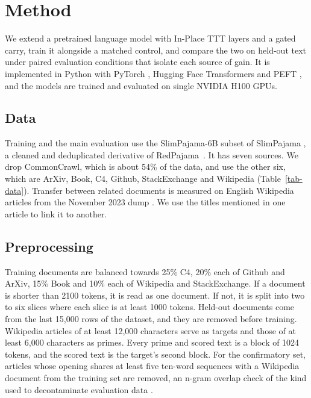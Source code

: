 \documentclass[10pt]{article} %
\begin{document}
\section{Method}

We extend a pretrained language model with In-Place TTT layers and a gated carry, train it alongside a matched control, and compare the two on held-out text under paired evaluation conditions that isolate each source of gain. It is implemented in Python with PyTorch \citep{paszke2019pytorch}, Hugging Face Transformers \citep{wolf2020transformers} and PEFT \citep{mangrulkar2022peft}, and the models are trained and evaluated on single NVIDIA H100 GPUs.

\subsection{Data}

Training and the main evaluation use the SlimPajama-6B subset \citep{yoon2023slimpajama6b} of SlimPajama \citep{soboleva2023slimpajama}, a cleaned and deduplicated derivative of RedPajama~\citep{weber2024redpajama}. It has seven sources. We drop CommonCrawl, which is about 54\% of the data, and use the other six, which are ArXiv, Book, C4, Github, StackExchange and Wikipedia (Table~\ref{tab-data}). Transfer between related documents is measured on English Wikipedia articles from the November 2023 dump \citep{wikimedia2023wikipedia}. We use the titles mentioned in one article to link it to another.

\subsection{Preprocessing}

Training documents are balanced towards 25\% C4, 20\% each of Github and ArXiv, 15\% Book and 10\% each of Wikipedia and StackExchange. If a document is shorter than 2100 tokens, it is read as one document. If not, it is split into two to six slices where each slice is at least 1000 tokens. Held-out documents come from the last 15{,}000 rows of the dataset, and they are removed before training. Wikipedia articles of at least 12{,}000 characters serve as targets and those of at least 6{,}000 characters as primes. Every prime and scored text is a block of 1024 tokens, and the scored text is the target's second block. For the confirmatory set, articles whose opening shares at least five ten-word sequences with a Wikipedia document from the training set are removed, an n-gram overlap check of the kind used to decontaminate evaluation data \citep{brown2020language}.
\end{document}
